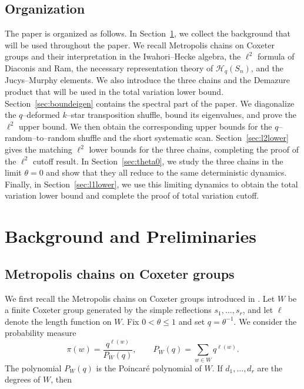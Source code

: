 \documentclass[11pt]{article}
\theoremstyle{plain}  %
\begin{document}
\subsection{Organization}\label{sec:organisation}


The paper is organized as follows. In Section~\ref{sec:background}, we collect the background that will be used throughout the paper. We recall Metropolis chains on Coxeter groups and their interpretation in the Iwahori--Hecke algebra, the $\ell^2$ formula of Diaconis and Ram, the necessary representation theory of $\mathcal{H}_q(S_n)$, and the Jucys--Murphy elements. We also introduce the three chains and the Demazure product that will be used in the total variation lower bound. Section~\ref{sec:boundeigen} contains the spectral part of the paper. We diagonalize the $q$--deformed $k$--star transposition shuffle, bound its eigenvalues, and prove the $\ell^2$ upper bound. We then obtain the corresponding upper bounds for the $q$--random--to--random shuffle and the short systematic scan. Section~\ref{sec:l2lower} gives the matching $\ell^2$ lower bounds for the three chains, completing the proof of the $\ell^2$ cutoff result. In Section~\ref{sec:theta0}, we study the three chains in the limit $\theta=0$ and show that they all reduce to the same deterministic dynamics. Finally, in Section~\ref{sec:l1lower}, we use this limiting dynamics to obtain the total variation lower bound and complete the proof of total variation cutoff.









\section{Background and Preliminaries}\label{sec:background}

\subsection{Metropolis chains on Coxeter groups}\label{sec:metropolis}

We first recall the Metropolis chains on Coxeter groups introduced in
\cite{DiaconisRam2000}. Let $W$ be a finite Coxeter group generated by the
simple reflections $s_1,\ldots,s_r$, and let $\ell$ denote the length function
on $W$. Fix $0<\theta\leq 1$ and set $q=\theta^{-1}$. We consider the
probability measure
\begin{equation}\label{eq:stationary}
\pi(w)
=
\frac{q^{\ell(w)}}{P_W(q)},
\qquad
P_W(q)=\sum_{w\in W}q^{\ell(w)}.
\end{equation}
The polynomial $P_W(q)$ is the Poincar\'{e} polynomial of $W$. If
$d_1,\ldots,d_r$ are the degrees of $W$, then
\end{document}
